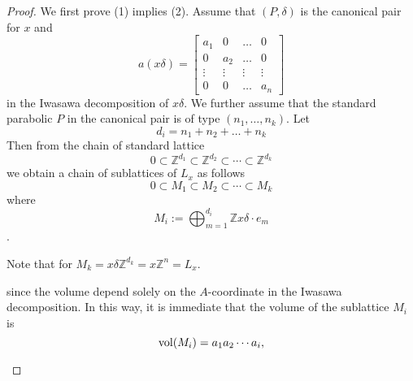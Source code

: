 \begin{proof}
    
    We first prove (1) implies (2). Assume that $(P,\delta)$ is the canonical pair for $x$ and
    \[a(x\delta) = \begin{bmatrix}
            a_1    & 0      & \ldots & 0      \\
            0      & a_2    & \ldots & 0      \\
            \vdots & \vdots & \vdots & \vdots \\
            0      & 0      & \ldots & a_n
        \end{bmatrix}\]
    in the Iwasawa decomposition of $x\delta$. We further assume that the standard parabolic
    $P$ in the canonical pair is of type $(n_1,\ldots, n_k)$. Let
    \[d_i = n_1+n_2+\ldots +n_k\]
     Then from the chain of standard lattice
    \[0 \subset \mathbb{Z}^{d_1} \subset \mathbb{Z}^{d_2} \subset \cdots \subset \mathbb{Z}^{d_k}\]
    we obtain a chain of sublattices of $L_x$ as follows
    \[0 \subset M_1 \subset M_2 \subset \cdots \subset M_k\]
    where $$M_i := \bigoplus_{m=1}^{d_i}\mathbb{Z}x\delta \cdot e_m$$.

    Note that for $M_k = x\delta\mathbb{Z}^{d_k} = x\mathbb{Z}^n = L_x$.

    since the volume depend solely on the $A$-coordinate in the Iwasawa decomposition.
    In this way, it is immediate that the volume of the sublattice $M_i$ is
    \[\operatorname{vol}(M_i) = a_1a_2\cdots a_i,\]
    \begin{figure}[hbt]
        \centering
        \caption{}
        \label{figureproof}
    \end{figure}




\end{proof}

